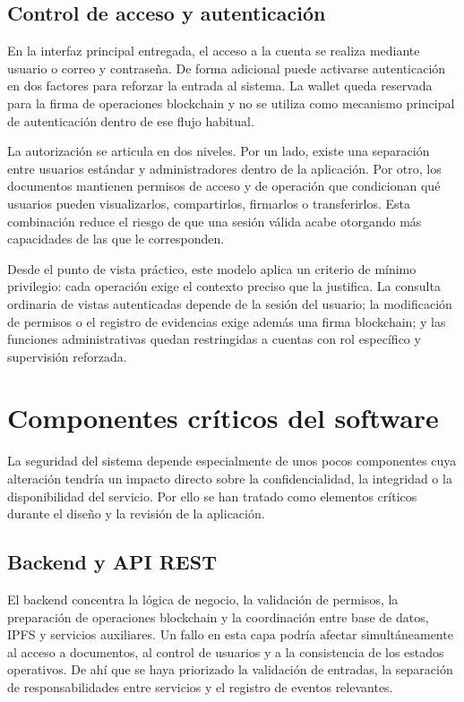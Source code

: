 \documentclass[11pt, a4paper]{article}
\begin{document}
\subsection{Control de acceso y autenticación}

En la interfaz principal entregada, el acceso a la cuenta se realiza mediante usuario o correo y contraseña. De forma adicional puede activarse autenticación en dos factores para reforzar la entrada al sistema. La wallet queda reservada para la firma de operaciones blockchain y no se utiliza como mecanismo principal de autenticación dentro de ese flujo habitual.

La autorización se articula en dos niveles. Por un lado, existe una separación entre usuarios estándar y administradores dentro de la aplicación. Por otro, los documentos mantienen permisos de acceso y de operación que condicionan qué usuarios pueden visualizarlos, compartirlos, firmarlos o transferirlos. Esta combinación reduce el riesgo de que una sesión válida acabe otorgando más capacidades de las que le corresponden.

Desde el punto de vista práctico, este modelo aplica un criterio de mínimo privilegio: cada operación exige el contexto preciso que la justifica. La consulta ordinaria de vistas autenticadas depende de la sesión del usuario; la modificación de permisos o el registro de evidencias exige además una firma blockchain; y las funciones administrativas quedan restringidas a cuentas con rol específico y supervisión reforzada.

\section{Componentes críticos del software}

La seguridad del sistema depende especialmente de unos pocos componentes cuya alteración tendría un impacto directo sobre la confidencialidad, la integridad o la disponibilidad del servicio. Por ello se han tratado como elementos críticos durante el diseño y la revisión de la aplicación.

\subsection{Backend y API REST}

El backend concentra la lógica de negocio, la validación de permisos, la preparación de operaciones blockchain y la coordinación entre base de datos, IPFS y servicios auxiliares. Un fallo en esta capa podría afectar simultáneamente al acceso a documentos, al control de usuarios y a la consistencia de los estados operativos. De ahí que se haya priorizado la validación de entradas, la separación de responsabilidades entre servicios y el registro de eventos relevantes.
\end{document}
